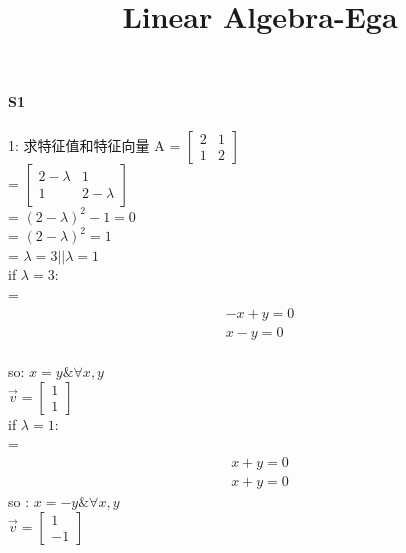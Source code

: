 \documentclass[12pt]{article}
\title{Linear Algebra-Ega}
\date{}
\begin{document}
\maketitle

\paragraph{S1}
\begin{flushleft}
    1: 求特征值和特征向量 A = $\begin{bmatrix}
            2 & 1 \\
            1 & 2
        \end{bmatrix}$ \\
    = $\begin{bmatrix}
            2 - \lambda & 1          \\
            1           & 2- \lambda
        \end{bmatrix}$ \\
    = $(2 - \lambda)^{2} - 1 = 0$ \\
    = $(2 - \lambda)^{2} = 1$ \\
    = $\lambda = 3 || \lambda = 1$ \\
    if $\lambda = 3$: \\
    = \begin{align}
        -x + y = 0 \\
        x - y = 0
    \end{align} \\
    so:  $x = y \& \forall x,y  \ $  \\
    $\vec{v} = \begin{bmatrix}
            1 \\
            1
        \end{bmatrix}$ \\
    if $\lambda = 1$: \\
    = \begin{align}
        x + y = 0 \\
        x + y = 0
    \end{align}
    so : $ x = -y \&  \forall x,y $ \\
    $\vec{v} = \begin{bmatrix}
            1 \\
            -1
        \end{bmatrix}$ \\

\end{flushleft}
\end{document}
